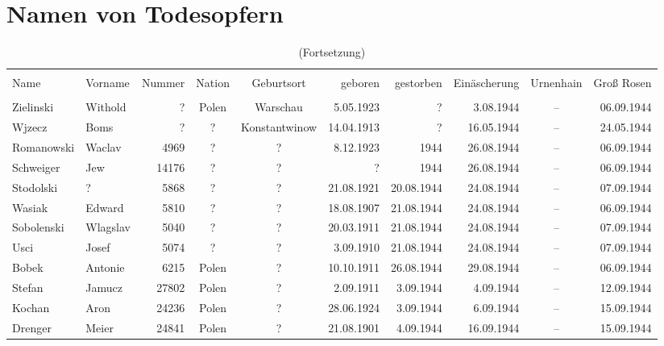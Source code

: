 \documentclass[a4paper,12pt,ngerman,
]{nisebook}
\begin{document}
 
\thispagestyle{empty}

\chapter{Namen von Todesopfern}
\vspace{-20pt}
\begin{tiny}\begin{longtable}[l]{|l|l|r|c|c|r|r|r|c|r|}
  \endfirsthead\pagebreak[20]\caption[]{(Fortsetzung)}\\[3pt]\endhead\endfoot
  
\hline  & \\[-9pt]
Name  &  Vorname  &  Nummer  &  Nation  &  Geburtsort  &  geboren  &  gestorben  &  Ein\-äscherung  &  Urnenhain  & Groß Rosen\\[3pt]
  \hline
 & \\[-9pt]
Zielinski  &  Withold  &  ?  &  Polen  &  Warschau  & 5.05.1923 & ?  & 3.08.1944 &  --  &  06.09.1944 \\[3pt]
Wjzecz  &  Boms  &  ?  &  ?  &  Konstantwinow  & 14.04.1913 & ?  & 16.05.1944 &  --  &  24.05.1944 \\[3pt]
Romanowski  &  Waclav  & 4969 &  ?  &  ?  & 8.12.1923 & 1944 & 26.08.1944 &  --  &  06.09.1944 \\[3pt]
Schweiger  &  Jew  & 14176 &  ?  &  ?  & ?  & 1944 & 26.08.1944 &  --  &  06.09.1944 \\[3pt]
Stodolski  &  ?  & 5868 &  ?  &  ?  & 21.08.1921 & 20.08.1944 & 24.08.1944 &  --  &  07.09.1944 \\[3pt]
Wasiak  &  Edward  & 5810 &  ?  &  ?  & 18.08.1907 & 21.08.1944 & 24.08.1944 &  --  &  06.09.1944 \\[3pt]
Sobolenski  &  Wlagslav  & 5040 &  ?  &  ?  & 20.03.1911 & 21.08.1944 & 24.08.1944 &  --  &  07.09.1944 \\[3pt]
Usci  &  Josef  & 5074 &  ?  &  ?  & 3.09.1910 & 21.08.1944 & 24.08.1944 &  --  &  07.09.1944 \\[3pt]
Bobek  &  Antonie  & 6215 &  Polen  &  ?  & 10.10.1911 & 26.08.1944 & 29.08.1944 &  --  &  06.09.1944 \\[3pt]
Stefan  &  Jamucz  & 27802 &  Polen  &  ?  & 2.09.1911 & 3.09.1944 & 4.09.1944 &  --  &  12.09.1944 \\[3pt]
Kochan  &  Aron  & 24236 &  Polen  &  ?  & 28.06.1924 & 3.09.1944 & 6.09.1944 &  --  &  15.09.1944 \\[3pt]
Drenger  &  Meier  & 24841 &  Polen  &  ?  & 21.08.1901 & 4.09.1944 & 16.09.1944 &  --  &  15.09.1944 \\[3pt]

\end{longtable}
\end{tiny}
\end{document}
